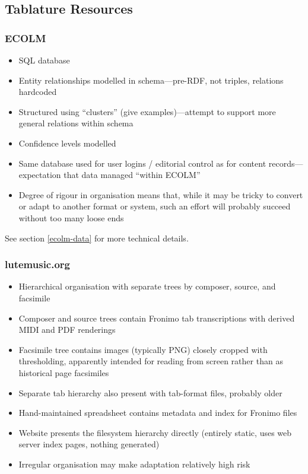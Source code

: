 \documentclass[9pt,twocolumn]{extarticle}
\begin{document}
\begin{sloppypar}
  \subsection{Tablature Resources}
  
  \subsubsection{ECOLM}

  \begin{itemize}
  \item SQL database
  \item Entity relationships modelled in schema---pre-RDF, not
    triples, relations hardcoded
  \item Structured using ``clusters'' (give examples)---attempt to
    support more general relations within schema
  \item Confidence levels modelled
  \item Same database used for user logins / editorial control as for
    content records---expectation that data managed ``within ECOLM''
  \item Degree of rigour in organisation means that, while it may be
    tricky to convert or adapt to another format or system, such an
    effort will probably succeed without too many loose ends
  \end{itemize}

  See section \ref{ecolm-data} for more technical details.
  
  \subsubsection{lutemusic.org}

  \begin{itemize}
  \item Hierarchical organisation with separate trees by composer,
    source, and facsimile
  \item Composer and source trees contain Fronimo tab transcriptions
    with derived MIDI and PDF renderings
  \item Facsimile tree contains images (typically PNG) closely cropped
    with thresholding, apparently intended for reading from screen
    rather than as historical page facsimiles
  \item Separate tab hierarchy also present with tab-format files,
    probably older
  \item Hand-maintained spreadsheet contains metadata and index for
    Fronimo files
  \item Website presents the filesystem hierarchy directly (entirely
    static, uses web server index pages, nothing generated)
  \item Irregular organisation may make adaptation relatively high
    risk
  \end{itemize}


\end{sloppypar}
\end{document}
